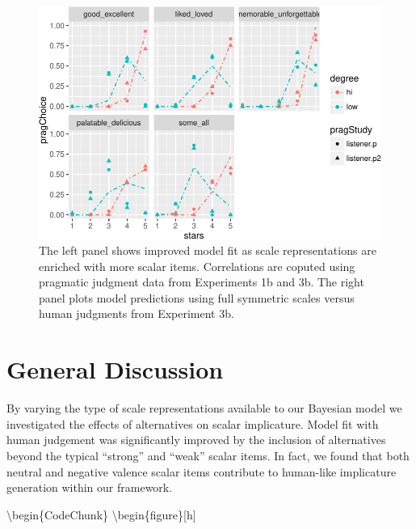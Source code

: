 \documentclass[10pt, letterpaper]{article}
\newenvironment{CodeChunk}{}{}
\begin{document}
\begin{CodeChunk}
\captionsetup{width=0.8\textwidth}\begin{figure}[t]

{\centering \includegraphics{figs/performancePlots-1} 

}

\caption[The left panel shows improved model fit as scale representations are enriched with more scalar items]{The left panel shows improved model fit as scale representations are enriched with more scalar items. Correlations are coputed using pragmatic judgment data from Experiments 1b and 3b. The right panel plots model predictions using full symmetric scales versus human judgments from Experiment 3b.}\label{fig:performancePlots}
\end{figure}
\end{CodeChunk}

\section{General Discussion}\label{general-discussion}

By varying the type of scale representations available to our Bayesian
model we investigated the effects of alternatives on scalar implicature.
Model fit with human judgement was significantly improved by the
inclusion of alternatives beyond the typical ``strong'' and ``weak''
scalar items. In fact, we found that both neutral and negative valence
scalar items contribute to human-like implicature generation within our
framework.

\textbackslash{}begin\{CodeChunk\}
\captionsetup{width=0.8\columnwidth}\textbackslash{}begin\{figure\}{[}h{]}
\end{document}
